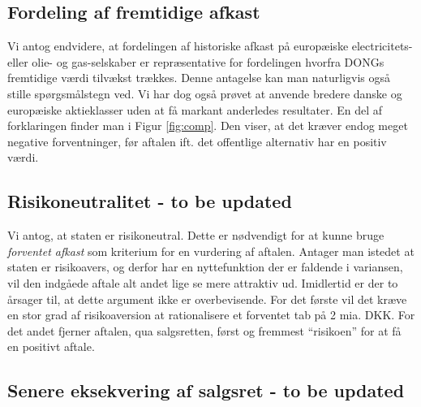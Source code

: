 \documentclass{article}
\begin{document}
\subsection{Fordeling af fremtidige afkast}

Vi antog endvidere, at fordelingen af historiske afkast på europæiske electricitets- eller olie- og gas-selskaber er repræsentative for fordelingen hvorfra DONGs fremtidige værdi tilvækst trækkes. Denne antagelse kan man naturligvis også stille spørgsmålstegn ved. Vi har dog også prøvet at anvende bredere danske og europæiske aktieklasser uden at få markant anderledes resultater. En del af forklaringen finder man i Figur \ref{fig:comp}. Den viser, at det kræver endog meget negative forventninger, før aftalen ift. det offentlige alternativ har en positiv værdi.


\subsection{Risikoneutralitet - to be updated}

Vi antog, at staten er risikoneutral. Dette er nødvendigt for at kunne bruge \emph{forventet afkast} som kriterium for en vurdering af aftalen. Antager man istedet at staten er risikoavers, og derfor har en nyttefunktion der er faldende i variansen, vil den indgåede aftale alt andet lige se mere attraktiv ud. Imidlertid er der to årsager til, at dette argument ikke er overbevisende. For det første vil det kræve en stor grad af risikoaversion at rationalisere et forventet tab på 2 mia. DKK. For det andet fjerner aftalen, qua salgsretten, først og fremmest \enquote{risikoen} for at få en positivt aftale. 

\subsection{Senere eksekvering af salgsret - to be updated}
\end{document}
